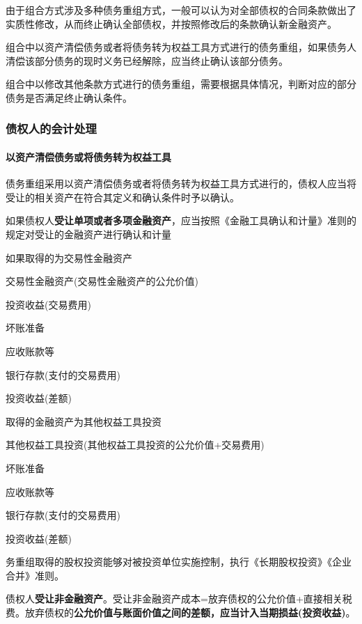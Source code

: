 \documentclass[UTF8,12pt]{ctexart}
\newenvironment{Dr}{%
	\begin{list}{}%
		{
			\setlength{\leftmargin}{2em}
			\setlength{\labelwidth}{2em}
			\setlength{\labelsep}{0pt}
			\setlength{\itemindent}{0pt}
			\setlength{\listparindent}{0pt}
			\setlength{\parsep}{0pt}
			\setlength{\topsep}{0pt}
		}
		\item[\textbf{借：}]
	}{%
	\end{list}
}
\newenvironment{Cr}{%
	\begin{list}{}%
		{
			\setlength{\leftmargin}{3em}
			\setlength{\labelwidth}{2em}
			\setlength{\labelsep}{0pt}
			\setlength{\itemindent}{0pt}
			\setlength{\listparindent}{0pt}
			\setlength{\parsep}{0pt}
			\setlength{\topsep}{0pt}
		}
		\item[\textbf{贷：}]
	}{%
	\end{list}
}
\numberwithin{equation}{section} %
\numberwithin{figure}{section}
\numberwithin{table}{section}
\begin{document}
	由于组合方式涉及多种债务重组方式，一般可以认为对全部债权的合同条款做出了实质性修改，从而终止确认全部债权，并按照修改后的条款确认新金融资产。
	
	组合中以资产清偿债务或者将债务转为权益工具方式进行的债务重组，如果债务人清偿该部分债务的现时义务已经解除，应当终止确认该部分债务。
	
	组合中以修改其他条款方式进行的债务重组，需要根据具体情况，判断对应的部分债务是否满足终止确认条件。
	
	\subsubsection{债权人的会计处理}
	\paragraph{以资产清偿债务或将债务转为权益工具}
	债务重组采用以资产清偿债务或者将债务转为权益工具方式进行的，债权人应当将受让的相关资产在符合其定义和确认条件时予以确认。
	
	如果债权人\textbf{受让单项或者多项金融资产}，应当按照《金融工具确认和计量》准则的规定对受让的金融资产进行确认和计量
	
	如果取得的为交易性金融资产
	\begin{Dr}
		交易性金融资产(交易性金融资产的公允价值)
		
		投资收益(交易费用)
		
		坏账准备
	\end{Dr}
	\begin{Cr}
		应收账款等
		
		银行存款(支付的交易费用)
		
		投资收益(差额)
	\end{Cr}
	
	取得的金融资产为其他权益工具投资
	\begin{Dr}
		其他权益工具投资(其他权益工具投资的公允价值+交易费用)
		
		坏账准备
	\end{Dr}
	\begin{Cr}
		应收账款等
		
		银行存款(支付的交易费用)
		
		投资收益(差额)
	\end{Cr}
	
	务重组取得的股权投资能够对被投资单位实施控制，执行《长期股权投资》《企业合并》准则。
	
	债权人\textbf{受让非金融资产}。受让非金融资产成本=放弃债权的公允价值+直接相关税费。放弃债权的\textbf{公允价值与账面价值之间的差额，应当计入当期损益(投资收益)}。
	
\end{document}

